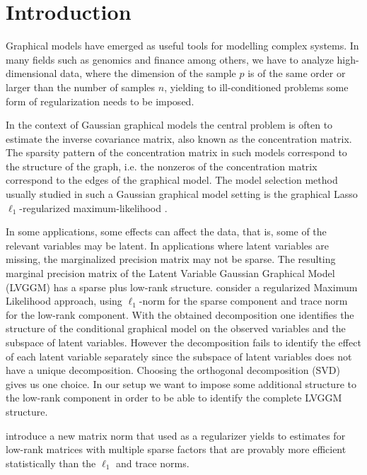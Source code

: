\section{Introduction}
\label{intro}


Graphical models have emerged as useful tools for modelling complex systems. In many fields such as genomics and finance among others, we have to analyze high-dimensional data, where the dimension of the sample $p$ is of the same order or larger than the number of samples $n$, yielding to ill-conditioned problems some form of regularization needs to be imposed.

In the context of Gaussian graphical models the central problem is often to estimate the inverse covariance matrix, also known as the concentration matrix. The sparsity pattern of the concentration matrix in such models correspond to the structure of the graph, i.e. the nonzeros of the concentration matrix correspond to the edges of the graphical model. The model selection method usually studied in such a Gaussian graphical model setting is the graphical Lasso $\ell_1$-regularized maximum-likelihood \citep{friedman2008sparse,yuan2007model,banerjee2008model}.

In some applications, some effects can affect the data, that is, some of the relevant variables may be latent. In applications where latent variables are missing, the marginalized precision matrix may not be sparse. The resulting marginal precision matrix of the Latent Variable Gaussian Graphical Model (LVGGM) has a sparse plus low-rank structure. \citet{chandrasekaran2010} consider a regularized Maximum Likelihood approach, using $\ell_1$-norm for the sparse component and trace norm for the low-rank component. With the obtained decomposition one identifies the structure of the conditional graphical model on the observed variables and the subspace of latent variables. However the decomposition fails to identify the effect of each latent variable separately since the subspace of latent variables does not have a unique decomposition. Choosing the orthogonal decomposition (SVD) gives us one choice. In our setup we want to impose some additional structure to the low-rank component in order to be able to identify the complete LVGGM structure.  

\citet{richard2014tight} introduce a new matrix norm that used as a regularizer yields to  estimates for low-rank matrices with multiple sparse factors that are provably more efficient statistically than the $\ell_1$ and trace norms.


